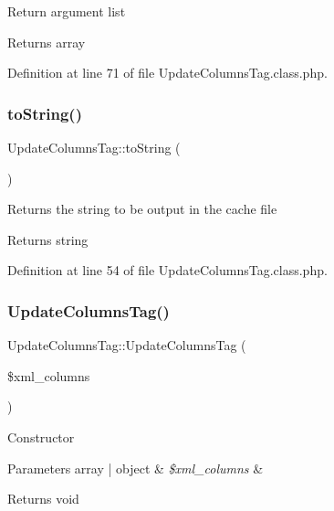 Return argument list

\begin{DoxyReturn}{Returns}
array 
\end{DoxyReturn}


Definition at line 71 of file Update\+Columns\+Tag.\+class.\+php.

\mbox{\label{classUpdateColumnsTag_a7653306405140623b429c3751ac11d7f}} 
\subsubsection{\texorpdfstring{to\+String()}{toString()}}
{\footnotesize\ttfamily Update\+Columns\+Tag\+::to\+String (\begin{DoxyParamCaption}{ }\end{DoxyParamCaption})}

Returns the string to be output in the cache file

\begin{DoxyReturn}{Returns}
string 
\end{DoxyReturn}


Definition at line 54 of file Update\+Columns\+Tag.\+class.\+php.

\mbox{\label{classUpdateColumnsTag_ac046fb7c43564e290d1022aa8299e1aa}} 
\subsubsection{\texorpdfstring{Update\+Columns\+Tag()}{UpdateColumnsTag()}}
{\footnotesize\ttfamily Update\+Columns\+Tag\+::\+Update\+Columns\+Tag (\begin{DoxyParamCaption}\item[{}]{\$xml\+\_\+columns }\end{DoxyParamCaption})}

Constructor


\begin{DoxyParams}[1]{Parameters}
array | object & {\em \$xml\+\_\+columns} & \\
\hline
\end{DoxyParams}
\begin{DoxyReturn}{Returns}
void 
\end{DoxyReturn}


